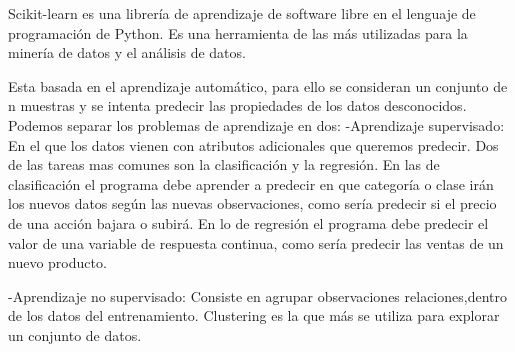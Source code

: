
Scikit-learn es una librería de aprendizaje de software libre en el lenguaje de programación de Python. Es una herramienta de las más utilizadas para la minería de datos y el análisis de datos. 

Esta basada en el aprendizaje automático, para ello se consideran un conjunto de n muestras y se intenta predecir las propiedades de los datos desconocidos. Podemos separar los problemas de aprendizaje en dos:
-Aprendizaje supervisado: En el que los datos vienen con atributos adicionales que queremos predecir. Dos de las tareas mas comunes son la clasificación y la regresión. En las de clasificación el programa debe aprender a predecir en que categoría o clase irán los nuevos datos según las nuevas observaciones, como sería predecir si el precio de una acción bajara o subirá. En lo de regresión el programa debe predecir el valor de una variable de respuesta continua, como sería predecir las ventas de un nuevo producto. 

-Aprendizaje no supervisado: Consiste en agrupar observaciones relaciones,dentro de los datos del entrenamiento. Clustering es la que más se utiliza para explorar un conjunto de datos.

